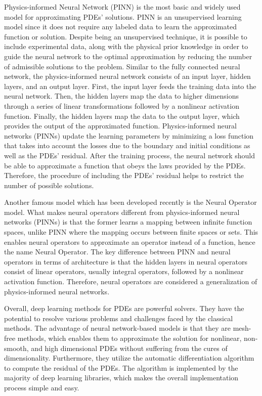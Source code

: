 \documentclass[a4paper,12pt]{article}
\theoremstyle{definition}
\begin{document}
Physics-informed Neural Network (PINN) is the most basic and widely used model for approximating PDEs' solutions. 
PINN is an unsupervised learning model since it does not require any 
labeled data to learn the approximated function or solution\cite{cuomo2022scientific}.
Despite being an unsupervised technique, it is possible to include experimental data, along with the physical prior knowledge
in order to guide the neural network to the optimal approximation by reducing the 
number of admissible solutions to the problem\cite{hao2022physics,raissi2019physics}.
Similar to the fully connected neural network, the physics-informed neural network consists of 
an input layer, hidden layers, and an output layer. First, the input layer feeds 
the training data into the neural network.  Then, the hidden layers map the data to higher dimensions through 
a series of linear transformations followed by a nonlinear activation function. 
Finally, the hidden layers map the data to the output layer, which provides the output of the approximated function. 
Physics-informed neural networks (PINNs) update the learning parameters by minimizing a loss function that takes 
into account the losses due to the boundary and initial conditions as well as the PDEs' residual. 
After the training process, the neural network should be able to approximate a function that obeys the laws provided by the PDEs. 
Therefore, the procedure of including the PDEs' residual helps to restrict the number of possible solutions\cite{cuomo2022scientific}. 

Another famous model which has been developed recently is the Neural Operator model. 
What makes neural operators different from physics-informed neural networks (PINNs) is that the former 
learns a mapping between infinite function spaces, unlike PINN where the mapping occurs between finite spaces or sets. 
This enables neural operators to approximate an operator instead of a function, hence the name Neural Operator.
The key difference between PINN and neural operators in terms of architecture is that the 
hidden layers in neural operators consist of linear operators, usually integral operators, 
followed by a nonlinear activation function. 
Therefore, neural operators are considered a generalization of physics-informed neural networks\cite{kovachki2021neural}.

Overall, deep learning methods for PDEs are powerful solvers. 
They have the potential to resolve various problems and challenges faced by the classical methods. 
The advantage of neural network-based models is that they are mesh-free methods, which enables them to approximate 
the solution for nonlinear, non-smooth, and high dimensional PDEs without suffering from the cures of dimensionality.
Furthermore, they utilize the automatic differentiation algorithm to compute the residual of the PDEs. 
The algorithm is implemented by the majority of deep learning libraries, 
which makes the overall implementation process simple and easy. 
\end{document}

